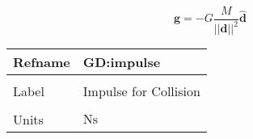 \documentclass[12pt]{article}
\begin{document}
\begin{displaymath}
\mathbf{g}=-G \frac{M}{{\text{||}\mathbf{d}\text{||}^{2}}} \mathbf{\hat{d}}
\end{displaymath}
\vspace{\baselineskip}
\noindent
\begin{minipage}{\textwidth}
\begin{tabular}{>{\raggedright}p{}>{\raggedright\arraybackslash}p{}}
\toprule \textbf{Refname} & \textbf{GD:impulse}
\label{GD:impulse}
\\ \midrule \\
Label & Impulse for Collision
        
\\ \midrule \\
Units & $\text{N}\text{s}$
        

\end{tabular}
\end{minipage}
\end{document}
